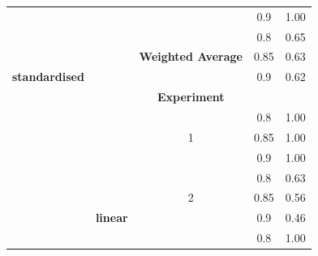 \documentclass{mpaper}
\begin{document}
\begin{table}[]
\begin{tabular}{|l|c|ccc|}
                                            &                 & \multicolumn{1}{c|}{}                          & \multicolumn{1}{c|}{0.9}                & 1.00               \\ \cline{3-5} 
                                            &                 & \multicolumn{1}{l|}{}                          & \multicolumn{1}{c|}{0.8}                & 0.65               \\
                                            &                 & \multicolumn{1}{c|}{\textbf{Weighted Average}} & \multicolumn{1}{c|}{0.85}               & 0.63               \\
\multicolumn{1}{|c|}{\textbf{standardised}} &                 & \multicolumn{1}{l|}{}                          & \multicolumn{1}{c|}{0.9}                & 0.62               \\ \cline{3-5}
                                            &                 & \multicolumn{1}{c|}{\textbf{Experiment}}       & \multicolumn{1}{c|}{}                   & \textbf{}          \\ \cline{3-5} 
                                            &                 & \multicolumn{1}{c|}{}                          & \multicolumn{1}{c|}{0.8}                & 1.00               \\
                                            &                 & \multicolumn{1}{c|}{1}                         & \multicolumn{1}{c|}{0.85}               & 1.00               \\
                                            &                 & \multicolumn{1}{c|}{}                          & \multicolumn{1}{c|}{0.9}                & 1.00               \\ \cline{3-5} 
                                            &                 & \multicolumn{1}{c|}{}                          & \multicolumn{1}{c|}{0.8}                & 0.63               \\
                                            &                 & \multicolumn{1}{c|}{2}                         & \multicolumn{1}{c|}{0.85}               & 0.56               \\
                                            & \textbf{linear} & \multicolumn{1}{c|}{}                          & \multicolumn{1}{c|}{0.9}                & 0.46               \\ \cline{3-5} 
                                            &                 & \multicolumn{1}{c|}{}                          & \multicolumn{1}{c|}{0.8}                & 1.00               \\

\end{tabular}
\end{table}
\end{document}

